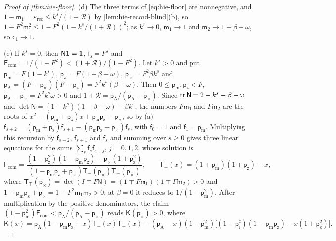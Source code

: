 \begin{proof}[Proof of \cref{thm:hie-floor}]
(d) The three terms of \eqref{eq:hie-floor} are nonnegative, and $1-\mathsf m_1=\varepsilon_{\mathrm{rec}}\le k^s/(1+\mathcal R)$ by \cref{lem:hie-record-blind}(b), so $1-F^2\mathsf m_1^2\le1-F^2(1-k^s/(1+\mathcal R))^2$; as $k^s\to0$, $\mathsf m_1\to1$ and $\mathsf m_2\to1-\beta-\omega$, so $\mathsf c_1\to1$.

(e) If $k^s=0$, then $\mathsf N\mathbf{1}=\mathbf{1}$, $\mathsf f_s=F^s$ and $\mathsf F_{\mathrm{com}}=1/(1-F^2)<(1+\mathcal R)/(1-F^2)$. Let $k^s>0$ and put $\mathsf p_{\mathrm m}=F(1-k^s)$, $\mathsf p_{\mathrm z}=F(1-\beta-\omega)$, $\mathsf p_\times=F^2\beta k^s$ and $\mathsf p_{\mathrm A}=(F-\mathsf p_{\mathrm m})(F-\mathsf p_{\mathrm z})=F^2k^s(\beta+\omega)$. Then $0\le\mathsf p_{\mathrm m},\mathsf p_{\mathrm z}<F$, $\mathsf p_{\mathrm A}-\mathsf p_\times=F^2k^s\omega>0$ and $1+\mathcal R=\mathsf p_{\mathrm A}/(\mathsf p_{\mathrm A}-\mathsf p_\times)$. Since $\operatorname{tr}\mathsf N=2-k^s-\beta-\omega$ and $\det\mathsf N=(1-k^s)(1-\beta-\omega)-\beta k^s$, the numbers $F\mathsf m_1$ and $F\mathsf m_2$ are the roots of $x^2-(\mathsf p_{\mathrm m}+\mathsf p_{\mathrm z})x+\mathsf p_{\mathrm m}\mathsf p_{\mathrm z}-\mathsf p_\times$, so by (a) $\mathsf f_{s+2}=(\mathsf p_{\mathrm m}+\mathsf p_{\mathrm z})\mathsf f_{s+1}-(\mathsf p_{\mathrm m}\mathsf p_{\mathrm z}-\mathsf p_\times)\mathsf f_s$, with $\mathsf f_0=1$ and $\mathsf f_1=\mathsf p_{\mathrm m}$. Multiplying this recursion by $\mathsf f_{s+2}$, $\mathsf f_{s+1}$ and $\mathsf f_s$ and summing over $s\ge0$ gives three linear equations for the sums $\sum_s\mathsf f_s\mathsf f_{s+j}$, $j=0,1,2$, whose solution is
\[
\mathsf F_{\mathrm{com}}=\frac{(1-\mathsf p_{\mathrm z}^2)(1-\mathsf p_{\mathrm m}\mathsf p_{\mathrm z})-\mathsf p_\times(1+\mathsf p_{\mathrm z}^2)}{(1-\mathsf p_{\mathrm m}\mathsf p_{\mathrm z}+\mathsf p_\times)\mathsf T_-(\mathsf p_\times)\mathsf T_+(\mathsf p_\times)},\qquad\mathsf T_\mp(x)=(1\mp\mathsf p_{\mathrm m})(1\mp\mathsf p_{\mathrm z})-x,
\]
where $\mathsf T_\mp(\mathsf p_\times)=\det(I\mp F\mathsf N)=(1\mp F\mathsf m_1)(1\mp F\mathsf m_2)>0$ and $1-\mathsf p_{\mathrm m}\mathsf p_{\mathrm z}+\mathsf p_\times=1-F^2\mathsf m_1\mathsf m_2>0$; at $\beta=0$ it reduces to $1/(1-\mathsf p_{\mathrm m}^2)$. After multiplication by the positive denominators, the claim $(1-\mathsf p_{\mathrm m}^2)\mathsf F_{\mathrm{com}}<\mathsf p_{\mathrm A}/(\mathsf p_{\mathrm A}-\mathsf p_\times)$ reads $\mathsf K(\mathsf p_\times)>0$, where
\[
\mathsf K(x)=\mathsf p_{\mathrm A}(1-\mathsf p_{\mathrm m}\mathsf p_{\mathrm z}+x)\mathsf T_-(x)\mathsf T_+(x)-(\mathsf p_{\mathrm A}-x)(1-\mathsf p_{\mathrm m}^2)\bigl[(1-\mathsf p_{\mathrm z}^2)(1-\mathsf p_{\mathrm m}\mathsf p_{\mathrm z})-x(1+\mathsf p_{\mathrm z}^2)\bigr].
\]
\end{proof}
